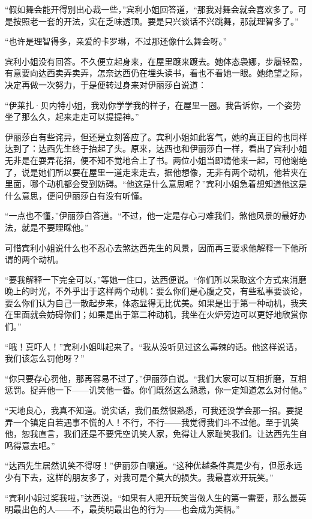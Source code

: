 \par “假如舞会能开得别出心裁一些，”宾利小姐回答道，“那我对舞会就会喜欢多了。可是按照老一套的开法，实在乏味透顶。要是只兴谈话不兴跳舞，那就理智多了。”
\par “也许是理智得多，亲爱的卡罗琳，不过那还像什么舞会呀。”
\par 宾利小姐没有回答。不久便立起身来，在屋里踱来踱去。她体态袅娜，步履轻盈，有意要向达西卖弄卖弄，怎奈达西仍在埋头读书，看也不看她一眼。她绝望之际，决定再做一次努力，于是便转过身来对伊丽莎白说道：
\par “伊莱扎·贝内特小姐，我劝你学学我的样子，在屋里一圈。我告诉你，一个姿势坐了那么久，起来走走可以提提神。”
\par 伊丽莎白有些诧异，但还是立刻答应了。宾利小姐如此客气，她的真正目的也同样达到了：达西先生终于抬起了头。原来，达西也和伊丽莎白一样，看出了宾利小姐无非是在耍弄花招，便不知不觉地合上了书。两位小姐当即请他来一起，可他谢绝了，说是她们所以要在屋里一道走来走去，据他想像，无非有两个动机，他若夹在里面，哪个动机都会受到妨碍。“他这是什么意思呢？”宾利小姐急着想知道他这是什么意思，便问伊丽莎白有没有听懂。
\par “一点也不懂，”伊丽莎白答道。“不过，他一定是存心刁难我们，煞他风景的最好办法，就是不要理睬他。”
\par 可惜宾利小姐说什么也不忍心去煞达西先生的风景，因而再三要求他解释一下他所谓的两个动机。
\par “要我解释一下完全可以，”等她一住口，达西便说。“你们所以采取这个方式来消磨晚上的时光，不外乎出于这样两个动机：要么你们是心腹之交，有些私事要谈论，要么你们认为自己一散起步来，体态显得无比优美。如果是出于第一种动机，我夹在里面就会妨碍你们；如果是出于第二种动机，我坐在火炉旁边可以更好地欣赏你们。”
\par “哦！真吓人！”宾利小姐叫起来了。“我从没听见过这么毒辣的话。他这样说话，我们该怎么罚他呀？”
\par “你只要存心罚他，那再容易不过了，”伊丽莎白说。“我们大家可以互相折磨，互相惩罚。捉弄他一下——讥笑他一番。你们既然这么熟悉，你一定知道怎么对付他。”
\par “天地良心，我真不知道。说实话，我们虽然很熟悉，可我还没学会那一招。要捉弄一个镇定自若遇事不慌的人！不行，不行——我觉得我们斗不过他。至于讥笑他，恕我直言，我们还是不要凭空讥笑人家，免得让人家耻笑我们。让达西先生自鸣得意去吧。”
\par “达西先生居然讥笑不得呀！”伊丽莎白嚷道。“这种优越条件真是少有，但愿永远少有下去，这样的朋友多了，对我可是个莫大的损失。我最喜欢开玩笑。”
\par “宾利小姐过奖我啦，”达西说。“如果有人把开玩笑当做人生的第一需要，那么最英明最出色的人——不，最英明最出色的行为——也会成为笑柄。”
